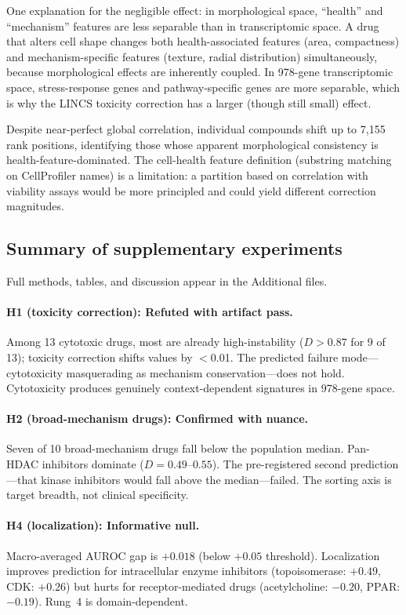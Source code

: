 \documentclass[10pt]{article}
\begin{document}
One explanation for the negligible effect: in morphological space,
``health'' and ``mechanism'' features are less separable than in
transcriptomic space. A drug that alters cell shape changes both
health-associated features (area, compactness) and mechanism-specific
features (texture, radial distribution) simultaneously, because
morphological effects are inherently coupled. In 978-gene transcriptomic
space, stress-response genes and pathway-specific genes are more
separable, which is why the LINCS toxicity correction has a larger
(though still small) effect.

Despite near-perfect global correlation, individual compounds shift up
to 7{,}155 rank positions, identifying those whose apparent morphological
consistency is health-feature-dominated. The cell-health feature
definition (substring matching on CellProfiler names) is a limitation:
a partition based on correlation with viability assays would be more
principled and could yield different correction magnitudes.

\subsection{Summary of supplementary experiments}

Full methods, tables, and discussion appear in the Additional files.

\paragraph{H1 (toxicity correction): Refuted with artifact pass.}
Among 13 cytotoxic drugs, most are already high-instability ($D > 0.87$
for 9 of 13); toxicity correction shifts values by $<$0.01. The predicted
failure mode---cytotoxicity masquerading as mechanism conservation---does
not hold. Cytotoxicity produces genuinely context-dependent signatures in
978-gene space.

\paragraph{H2 (broad-mechanism drugs): Confirmed with nuance.}
Seven of 10 broad-mechanism drugs fall below the population median.
Pan-HDAC inhibitors dominate ($D = 0.49$--$0.55$). The pre-registered
second prediction---that kinase inhibitors would fall above the
median---failed. The sorting axis is target breadth, not clinical
specificity.

\paragraph{H4 (localization): Informative null.}
Macro-averaged AUROC gap is $+0.018$ (below $+0.05$ threshold). Localization
improves prediction for intracellular enzyme inhibitors (topoisomerase:
$+0.49$, CDK: $+0.26$) but hurts for receptor-mediated drugs
(acetylcholine: $-0.20$, PPAR: $-0.19$). Rung~4 is domain-dependent.
\end{document}
